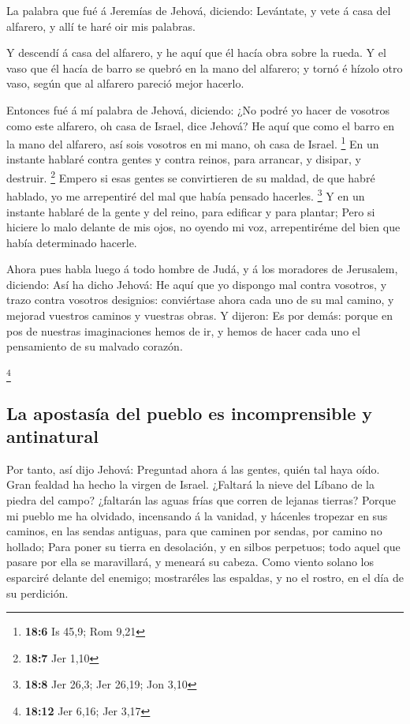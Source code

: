  La palabra que fué á Jeremías de Jehová, diciendo:
 Levántate, y vete á casa del alfarero, y allí te haré oir
mis palabras.

 Y descendí á casa del alfarero, y he aquí que él hacía obra
sobre la rueda.  Y el vaso que él hacía de barro se quebró
en la mano del alfarero; y tornó é hízolo otro vaso, según que al
alfarero pareció mejor hacerlo.

 Entonces fué á mí palabra de Jehová, diciendo: 
¿No podré yo hacer de vosotros como este alfarero, oh casa de Israel,
dice Jehová? He aquí que como el barro en la mano del alfarero, así sois
vosotros en mi mano, oh casa de Israel. \footnote{\textbf{18:6} Is 45,9;
  Rom 9,21}  En un instante hablaré contra gentes y contra
reinos, para arrancar, y disipar, y destruir. \footnote{\textbf{18:7}
  Jer 1,10}  Empero si esas gentes se convirtieren de su
maldad, de que habré hablado, yo me arrepentiré del mal que había
pensado hacerles. \footnote{\textbf{18:8} Jer 26,3; Jer 26,19; Jon 3,10}
 Y en un instante hablaré de la gente y del reino, para
edificar y para plantar;  Pero si hiciere lo malo delante
de mis ojos, no oyendo mi voz, arrepentiréme del bien que había
determinado hacerle.

 Ahora pues habla luego á todo hombre de Judá, y á los
moradores de Jerusalem, diciendo: Así ha dicho Jehová: He aquí que yo
dispongo mal contra vosotros, y trazo contra vosotros designios:
conviértase ahora cada uno de su mal camino, y mejorad vuestros caminos
y vuestras obras.  Y dijeron: Es por demás: porque en pos
de nuestras imaginaciones hemos de ir, y hemos de hacer cada uno el
pensamiento de su malvado corazón.

\footnote{\textbf{18:12} Jer 6,16; Jer 3,17}

\hypertarget{la-apostasuxeda-del-pueblo-es-incomprensible-y-antinatural}{%
\subsection{La apostasía del pueblo es incomprensible y
antinatural}\label{la-apostasuxeda-del-pueblo-es-incomprensible-y-antinatural}}

 Por tanto, así dijo Jehová: Preguntad ahora á las gentes,
quién tal haya oído. Gran fealdad ha hecho la virgen de Israel.
 ¿Faltará la nieve del Líbano de la piedra del campo?
¿faltarán las aguas frías que corren de lejanas tierras? 
Porque mi pueblo me ha olvidado, incensando á la vanidad, y hácenles
tropezar en sus caminos, en las sendas antiguas, para que caminen por
sendas, por camino no hollado;  Para poner su tierra en
desolación, y en silbos perpetuos; todo aquel que pasare por ella se
maravillará, y meneará su cabeza.  Como viento solano los
esparciré delante del enemigo; mostraréles las espaldas, y no el rostro,
en el día de su perdición.

